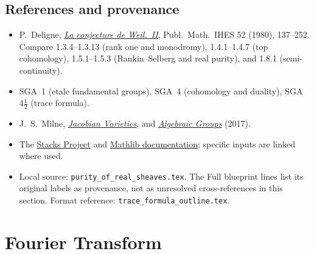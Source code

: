 \documentclass[11pt]{article}
\theoremstyle{plain}
\theoremstyle{definition}
\newcommand{\Fq}{\mathbf F_{r}}
\newcommand{\uses}[1]{\par\smallskip\noindent{\footnotesize\textit{Uses:}\ #1\par}\smallskip}
\begin{document}
\subsection*{References and provenance}
\begin{itemize}
\item P.~Deligne,
\href{https://publications.ias.edu/sites/default/files/Number40.pdf}
{\emph{La conjecture de Weil.~II}}, Publ.\ Math.\ IHES 52 (1980),
137--252. Compare 1.3.4--1.3.13 (rank one and monodromy),
1.4.1--1.4.7 (top cohomology), 1.5.1--1.5.3 (Rankin--Selberg and
real purity), and 1.8.1 (semi-continuity).
\item SGA~1 (etale fundamental groups), SGA~4 (cohomology and duality),
SGA~$4\frac12$ (trace formula).
\item J.~S.~Milne,
\href{https://www.jmilne.org/math/xnotes/JVs.pdf}{\emph{Jacobian Varieties}},
and \href{https://www.jmilne.org/math/Books/iAG2017.pdf}
{\emph{Algebraic Groups}} (2017).
\item The \href{https://stacks.math.columbia.edu/}{Stacks Project}
and \href{https://leanprover-community.github.io/mathlib4_docs/}
{Mathlib documentation}; specific inputs are linked where used.
\item Local source: \texttt{purity\_of\_real\_sheaves.tex}.
The \textsf{Full blueprint} lines list its original labels as provenance,
not as unresolved cross-references in this section.
Format reference: \texttt{trace\_formula\_outline.tex}.
\end{itemize}
\endgroup

\clearpage
\begingroup
\setlength{\emergencystretch}{3em}
\let\fourieruses\uses
\renewcommand{\uses}[1]{{\raggedright\fourieruses{#1}}}
\renewcommand{\Fq}{\mathbf F_q}
\newcommand{\Ql}{\mathbf Q_\ell}
\newcommand{\Qlb}{\overline{\mathbf Q}_\ell}
\newcommand{\FT}{\operatorname{FT}}
\newcommand{\Aone}{\mathbf A^1}
\newcommand{\Dbc}{D^b_c}
\newcommand{\bp}[1]{{\scriptsize\nolinkurl{#1}}}
\section{Fourier Transform}
\label{sec:fourier-transform}
\begin{abstract}
content:definition and some basic properties about fourier transform
\\key theorem: P1-P14 in subsection~\ref{sec:fourier-ledger}
\\references: statement in KW, proof in detailed blueprint
\end{abstract}
\end{document}

